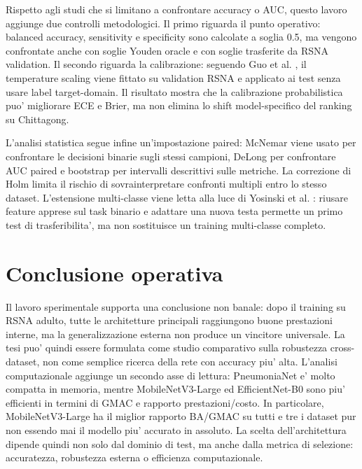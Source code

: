 \documentclass[11pt,a4paper]{article}
\begin{document}
Rispetto agli studi che si limitano a confrontare accuracy o AUC, questo lavoro
aggiunge due controlli metodologici. Il primo riguarda il punto operativo:
balanced accuracy, sensitivity e specificity sono calcolate a soglia 0.5, ma
vengono confrontate anche con soglie Youden oracle e con soglie trasferite da
RSNA validation. Il secondo riguarda la calibrazione: seguendo Guo et al.
\cite{guo2017calibration}, il temperature scaling viene fittato su validation
RSNA e applicato ai test senza usare label target-domain. Il risultato mostra
che la calibrazione probabilistica puo' migliorare ECE e Brier, ma non elimina
lo shift model-specifico del ranking su Chittagong.

L'analisi statistica segue infine un'impostazione paired: McNemar
\cite{mcnemar1947} viene usato per confrontare le decisioni binarie sugli
stessi campioni, DeLong \cite{delong1988} per confrontare AUC paired e bootstrap
\cite{efron1979bootstrap} per intervalli descrittivi sulle metriche. La
correzione di Holm \cite{holm1979} limita il rischio di sovrainterpretare
confronti multipli entro lo stesso dataset. L'estensione multi-classe viene
letta alla luce di Yosinski et al. \cite{yosinski2014transferable}: riusare
feature apprese sul task binario e adattare una nuova testa permette un primo
test di trasferibilita', ma non sostituisce un training multi-classe completo.

\section{Conclusione operativa}

Il lavoro sperimentale supporta una conclusione non banale: dopo il training su
RSNA adulto, tutte le architetture principali raggiungono buone prestazioni
interne, ma la generalizzazione esterna non produce un vincitore universale. La
tesi puo' quindi essere formulata come studio comparativo sulla robustezza
cross-dataset, non come semplice ricerca della rete con accuracy piu' alta.
L'analisi computazionale aggiunge un secondo asse di lettura: PneumoniaNet e'
molto compatta in memoria, mentre MobileNetV3-Large ed EfficientNet-B0 sono piu'
efficienti in termini di GMAC e rapporto prestazioni/costo. In particolare,
MobileNetV3-Large ha il miglior rapporto BA/GMAC su tutti e tre i dataset pur
non essendo mai il modello piu' accurato in assoluto. La scelta
dell'architettura dipende quindi non solo dal dominio di test, ma anche dalla
metrica di selezione: accuratezza, robustezza esterna o efficienza
computazionale.
\end{document}
